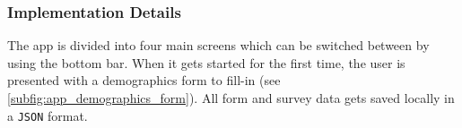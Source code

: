 \subsubsection{Implementation Details}\label{subsec:implementation_details}

\def\mapscreen{\textsf{Map Screen}\xspace}
\def\routesscreen{\textsf{Routes Screen}\xspace}
\def\devicesscreen{\textsf{Devices Screen}\xspace}
\def\settingsscreen{\textsf{Settings Screen}\xspace}

The app is divided into four main screens which can be switched between by using the bottom bar.
When it gets started for the first time, the user is presented with a demographics form to fill-in (see \autoref{subfig:app_demographics_form}).
All form and survey data gets saved locally in a \texttt{JSON} format.

